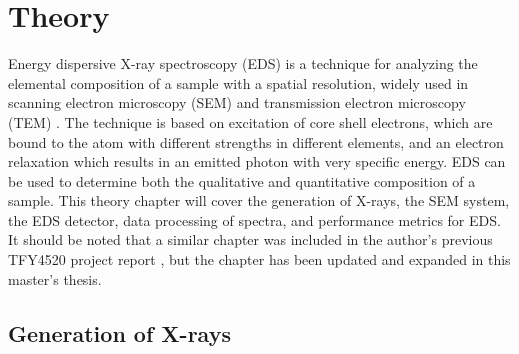 \chapter{Theory}
\label{ch:theory}






Energy dispersive X-ray spectroscopy (EDS) is a technique for analyzing the elemental composition of a sample with a spatial resolution, widely used in scanning electron microscopy (SEM) and transmission electron microscopy (TEM) \cite{goldstein_scanning_2018,williams_carter_tem_2009}.
The technique is based on excitation of core shell electrons, which are bound to the atom with different strengths in different elements, and an electron relaxation which results in an emitted photon with very specific energy.
EDS can be used to determine both the qualitative and quantitative composition of a sample.
This theory chapter will cover the generation of X-rays, the SEM system, the EDS detector, data processing of spectra, and performance metrics for EDS.
It should be noted that a similar chapter was included in the author's previous TFY4520 project report \cite{project_report}, but the chapter has been updated and expanded in this master's thesis.



\section{Generation of X-rays}
\label{theory:xray_formation}

